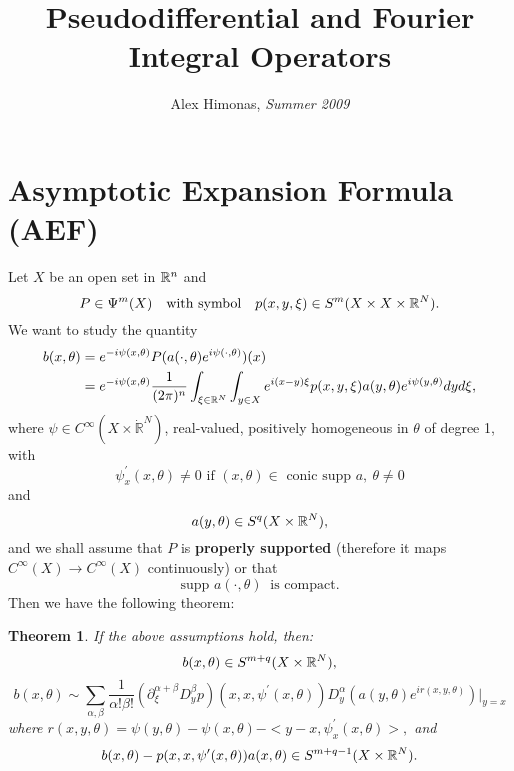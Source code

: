 \documentclass[12pt,reqno]{amsart}
\newcommand{\rr}{\mathbb{R}}
\theoremstyle{plain}  %
\newtheorem{theorem}{Theorem}
\theoremstyle{definition}
\newcommand{\nin}{\noindent}
\begin{document}
\title{Pseudodifferential and Fourier Integral Operators}
\author{Alex Himonas, {\it Summer 2009}}
\maketitle
\setcounter{section}{4}
\section{Asymptotic Expansion Formula (AEF)}
Let $ X $ be an open set in $ \Bbb R^n $ and 
$$P\in \Psi^m(X) \quad\text {with symbol}
 \quad p(x, y, \xi) \in S^m(X\times X\times \Bbb R^N).$$ 
We want to
study the quantity \begin{equation*}
	\begin{split}
b(x, \theta) &= e^{-i \psi(x, \theta)} P(a(\cdot, \theta) e^{i \psi (\cdot,
\theta)}) (x)\\
&= e^{-i \psi(x, \theta)} \frac{1}{( 2 \pi)^n} \int_{\xi \in \Bbb R^N} \int_{y \in X}
e^{i(x-y)\xi} p(x, y, \xi) a(y, \theta) e^{i \psi (y, \theta)} dy d\xi,
\end{split}
\end{equation*}
where $ \psi \in C^\infty (X \times \dot{\rr}^N)$, real-valued,
positively homogeneous in $ \theta $ of degree 1, with
$$\psi^\prime_x (x,\theta) \ne 0 \text{ if } (x, \theta) \in \text{ conic supp } a, \
\theta \ne 0$$ 
and
$$ a(y, \theta) \in S^q (X \times \Bbb R^N),$$
  and we shall
assume that $ P $ is {\bf  properly supported}
 (therefore it maps  $ C^\infty (X)
\longrightarrow C^\infty (X) $ continuously)
 or that 
$$\text{supp } a(\cdot, \theta)\;\; \text{is
compact}. $$ 
Then we have the following theorem: 
\begin{theorem}  If the above assumptions hold,  then:
	\begin{equation}
		\label{4}
		b(x, \theta) \in S^{m+q} (X\times \Bbb R^N),
	\end{equation}
	\begin{equation}
		\label{5}
		b(x, \theta) \sim \sum_{\alpha, \beta} \frac{1}{\alpha ! \beta!} \left (
\partial^{\alpha + \beta}_\xi D^\beta_y p \right ) (x, x, \psi^\prime (x, \theta) )
D^\alpha_y (a(y, \theta) e^{i r(x, y, \theta)} ) \big |_{y=x}  
\end{equation}
where $r(x, y, \theta) = \psi (y, \theta) - \psi (x, \theta) - <y-x, \psi^\prime_x
(x, \theta) >,$
\smallskip
\nin 
and
\begin{equation}
	\label{6}
	b(x, \theta) - p(x, x, \psi^\prime (x, \theta)) a(x, \theta) \in S^{m+q-1} (X
\times \Bbb R^N). 
\end{equation}
\end{theorem}
\end{document}
